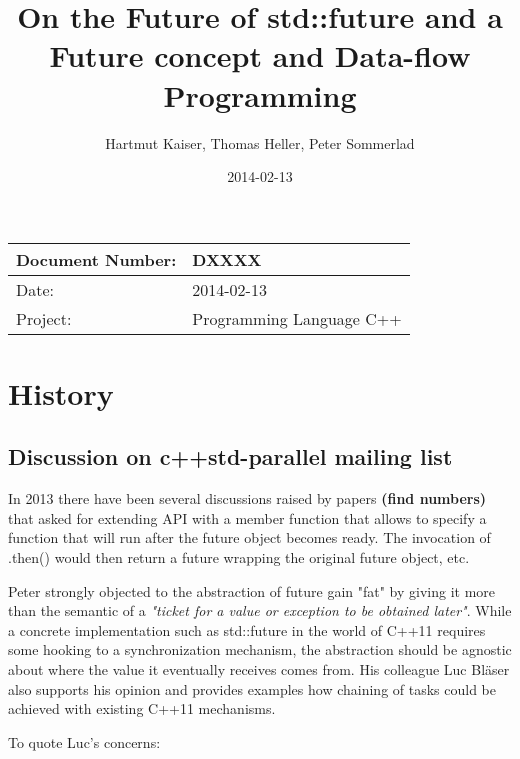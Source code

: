 \documentclass[ebook,11pt,article]{memoir}
\title{On the Future of std::future and a Future concept and Data-flow Programming}
\author{Hartmut Kaiser, Thomas Heller, Peter Sommerlad}
\date{2014-02-13}                                           %
\begin{document}
\maketitle
\begin{tabular}[t]{|l|l|}\hline 
Document Number: & DXXXX \\\hline
Date: & 2014-02-13 \\\hline
Project: & Programming Language C++\\\hline 
\end{tabular}
\chapter{History}
\section{Discussion on c++std-parallel mailing list}

In 2013 there have been several discussions raised by papers \textbf{(find numbers)} that asked for extending  API with a member function  that allows to specify a function that will run after the future object becomes ready. The invocation of .then() would then return a future wrapping the original future object, etc. 

Peter strongly objected to the abstraction of future gain "fat" by giving it more than the semantic of a \emph{"ticket for a value or exception to be obtained later"}. While a concrete implementation such as std::future in the world of C++11 requires some hooking to a synchronization mechanism, the abstraction should be agnostic about where the value it eventually receives comes from. His colleague Luc Bläser also supports his opinion and provides examples how chaining of tasks could be achieved with existing C++11 mechanisms.

To quote Luc's concerns:
\end{document}
